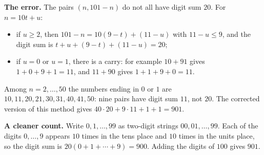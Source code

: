 \textbf{The error.} The pairs $(n,101-n)$ do not all have digit sum $20$. For $n=10t+u$:
\begin{itemize}
\item if $u\ge2$, then $101-n=10(9-t)+(11-u)$ with $11-u\le9$, and the digit sum is $t+u+(9-t)+(11-u)=20$;
\item if $u=0$ or $u=1$, there is a carry: for example $10+91$ gives $1+0+9+1=11$, and $11+90$ gives $1+1+9+0=11$.
\end{itemize}
Among $n=2,\dots,50$ the numbers ending in $0$ or $1$ are $10,11,20,21,30,31,40,41,50$: nine pairs have digit sum $11$, not $20$. The corrected version of this method gives $40\cdot20+9\cdot11+1+1=901$.

\textbf{A cleaner count.} Write $0,1,\dots,99$ as two-digit strings $00,01,\dots,99$. Each of the digits $0,\dots,9$ appears $10$ times in the tens place and $10$ times in the units place, so the digit sum is $20(0+1+\cdots+9)=900$. Adding the digits of $100$ gives $\boxed{901}$.

